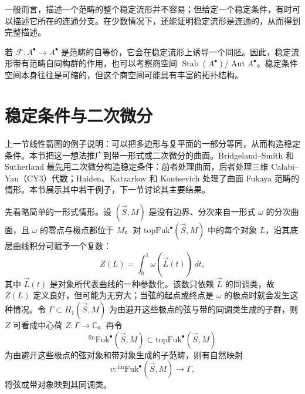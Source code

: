 \begin{note}[稳定流形的连通分支]\label{note:stability-manifold-components}
一般而言，描述一个范畴的整个稳定流形并不容易；但给定一个稳定条件，有时可以描述它所在的连通分支。在少数情况下，还能证明稳定流形是连通的，从而得到完整描述。
\end{note}

\begin{note}[自等价群对稳定流形的作用]\label{note:stability-manifold-autoequivalences}
若 $\mathcal F\colon A^{\bullet}\to A^{\bullet}$ 是范畴的自等价，它会在稳定流形上诱导一个同胚。因此，稳定流形带有范畴自同构群的作用，也可以考察商空间 $\operatorname{Stab}(A^{\bullet})/\operatorname{Aut}A^{\bullet}$。稳定条件空间本身往往是可缩的，但这个商空间可能具有丰富的拓扑结构。
\end{note}


\section{稳定条件与二次微分}\label{sec:stability-quadratic-differentials}

上一节线性箭图的例子说明：可以把多边形与复平面的一部分等同，从而构造稳定条件。本节把这一想法推广到带一形式或二次微分的曲面。Bridgeland--Smith 和 Sutherland 最先用二次微分构造稳定条件：前者处理曲面，后者处理三维 Calabi--Yau（CY3）代数；Haiden、Katzarkov 和 Kontsevich 处理了曲面 Fukaya 范畴的情形。本节展示其中若干例子，下一节讨论其主要结果。

先看略简单的一形式情形。设 $(\vec S,M)$ 是没有边界、分次来自一形式 $\omega$ 的分次曲面，且 $\omega$ 的零点与极点都位于 $M$。对 $\mathrm{topFuk}^{\bullet}(\vec S,M)$ 中的每个对象 $L$，沿其底层曲线积分可赋予一个复数：
\[
  Z(L)=\int_0^1\omega(\dot{\vec L}(t))\,dt,
\]
其中 $\vec L(t)$ 是对象所代表曲线的一种参数化。该数只依赖 $\vec L$ 的同调类，故 $Z(L)$ 定义良好，但可能为无穷大；当弦的起点或终点是 $\omega$ 的极点时就会发生这种情况。令 $\Gamma\subset H_1(\vec S,M)$ 为由避开这些极点的弦与带的同调类生成的子群，则 $Z$ 可看成中心荷 $Z\colon\Gamma\to\mathbb C$。再令
\[
  {}^{\mathrm{fin}}\mathrm{Fuk}^{\bullet}(\vec S,M)
  \subset\mathrm{topFuk}^{\bullet}(\vec S,M)
\]
为由避开这些极点的弦对象和带对象生成的子范畴，则有自然映射
\[
  v\colon{}^{\mathrm{fin}}\mathrm{Fuk}^{\bullet}(\vec S,M)\longrightarrow\Gamma,
\]
将弦或带对象映到其同调类。

